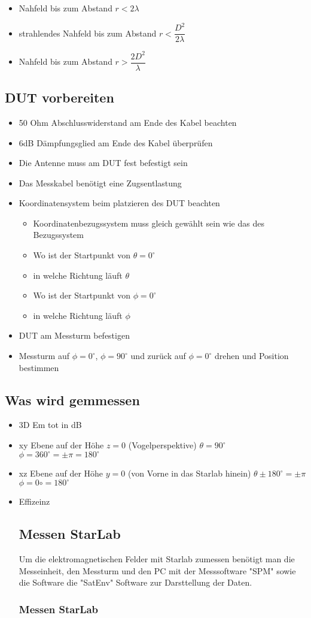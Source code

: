 	\begin{itemize}
	\item Nahfeld bis zum Abstand $r<2\lambda$
	\item strahlendes Nahfeld bis zum Abstand $r<\dfrac{D^2}{2\lambda}$
	\item Nahfeld bis zum Abstand $r>\dfrac{2D^2}{\lambda}$
\end{itemize}	 

	\subsection{DUT vorbereiten}
	\begin{itemize}
	\item 50 Ohm Abschlusswiderstand am Ende des Kabel beachten
	\item 6dB Dämpfungsglied am Ende des Kabel überprüfen
	\item Die Antenne muss am DUT fest befestigt sein
	\item Das Messkabel benötigt eine Zugsentlastung
	\item Koordinatensystem beim platzieren des DUT beachten
	\begin{itemize}
	\item Koordinatenbezugssystem muss gleich gewählt sein wie das des Bezugssystem
	\item Wo ist der Startpunkt von $\theta=0^\circ$
	\item in welche Richtung läuft $\theta$
	\item Wo ist der Startpunkt von $\phi=0^\circ$
	\item in welche Richtung läuft $\phi$
	\end{itemize}
	\item DUT am Messturm befestigen 
	\item Messturm auf $\phi=0^\circ$, $\phi=90^\circ$ und zurück auf $\phi=0^\circ$ drehen und Position bestimmen
	\end{itemize}
\subsection{Was wird gemmessen}
\begin{itemize}
	\item 3D Em tot in dB
	\item xy Ebene auf der Höhe $z=0$ (Vogelperspektive) $\theta=90^\circ$ $\phi=360^\circ= \pm \pi=180^\circ$
	\item xz Ebene auf der Höhe $y=0$ (von Vorne in das Starlab hinein) $\theta\pm 180^\circ =\pm \pi$ $\phi= 0\circ = 180^\circ$
	\item Effizeinz
	\subsection{Messen StarLab}
	Um die elektromagnetischen Felder mit Starlab zumessen benötigt man  die Messeinheit, den Messturm und den PC mit der Messsoftware "SPM" sowie die Software die "SatEnv" Software  zur Darsttellung der Daten.
	\subsubsection{Messen StarLab}
\end{itemize}

